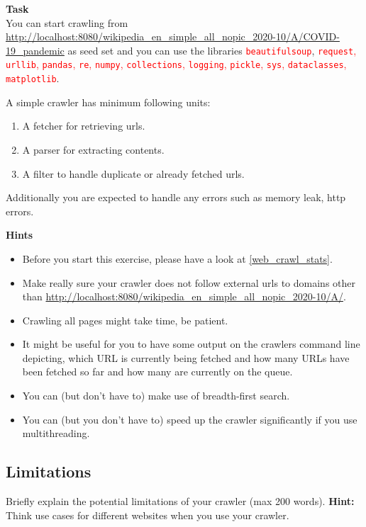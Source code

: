 \documentclass{resources/WeSTassignment}
\begin{document}
\textbf{Task} \\
You can start crawling from \url{http://localhost:8080/wikipedia_en_simple_all_nopic_2020-10/A/COVID-19_pandemic} as seed set and you can use the libraries \textcolor{red}{\texttt{beautifulsoup}}, \textcolor{red}{\texttt{request}, \texttt{urllib}, \texttt{pandas}, \texttt{re}, \texttt{numpy}, \texttt{collections}, \texttt{logging}, \texttt{pickle}, \texttt{sys}, \texttt{dataclasses}, \texttt{matplotlib}}.

A simple crawler has minimum following units:\\
\begin{enumerate}
    \item A fetcher for retrieving urls.
    \item A parser for extracting contents.
    \item A filter to handle duplicate or already fetched urls.
\end{enumerate}
Additionally you are expected to handle any errors such as memory leak, http errors. 

\textbf{Hints} \\

\begin{itemize}
    \item Before you start this exercise, please have a look at \ref{web_crawl_stats}. 
    \item Make really sure your crawler does not follow external urls to domains other than \url{http://localhost:8080/wikipedia_en_simple_all_nopic_2020-10/A/}.
    \item Crawling all pages might take time, be patient.
    \item It might be useful for you to have some output on the crawlers command line depicting, which URL is currently being fetched and how many URLs have been fetched so far and how many are currently on the queue.
    \item  You can (but don’t have to) make use of breadth-first search.
    \item You can (but you don’t have to) speed up the crawler significantly if you use multithreading.
\end{itemize}

\subsection{Limitations} 
Briefly explain the potential limitations of your crawler (max 200 words). \textbf{Hint:} Think use cases for different websites when you use your crawler.
\end{document}
